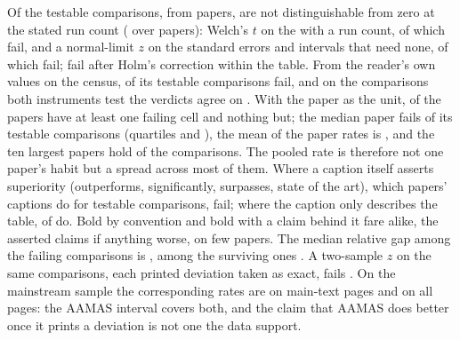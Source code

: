 \documentclass[sigconf,anonymous]{aamas}
\begin{document}
Of the \nANTestable{} testable comparisons, from \nAPapersTestable{} papers,
\nAPctFail{} are not distinguishable from zero at the stated run count
(\nAPctFailCi{} over papers): Welch's $t$ on the \nWelchN{} with a run
count, \nWelchFail{} of which fail, and a normal-limit $z$ on the \nZN{}
standard errors and intervals that need none, \nZFail{} of which fail;
\nAPctFailHolm{} fail after Holm's correction within the table. From the
reader's own values on the census, \nCzReaderFail{} of its
\nCzReaderFailN{} testable comparisons fail, and on the \nCzShared{}
comparisons both instruments test the verdicts agree on \nCzSharedAgree{}.
With the paper as the unit, \nPpAnyFail{} of the \nPpPapers{} papers have at least
one failing cell and \nPpAllFail{} nothing but; the median paper fails
\nPpMedian{} of its testable comparisons (quartiles \nPpQOne{} and
\nPpQThree{}), the mean of the paper rates is \nPpMean{}, and the ten
largest papers hold \nPpTopTenShare{} of the comparisons. The pooled rate
is therefore not one paper's habit but a spread across most of them. Where
a caption itself asserts superiority (outperforms, significantly, surpasses,
state of the art), which \nCapAssertingPapers{} papers' captions do for
\nCapAssertingN{} testable comparisons, \nCapAssertingFail{} fail; where
the caption only describes the table, \nCapDescribingFail{} of
\nCapDescribingN{} do. Bold by convention and bold with a claim behind it
fare alike, the asserted claims if anything worse, on few papers. The median relative gap among the failing
comparisons is \nAGapFail{}, among the surviving ones \nAGapPass{}. A
two-sample $z$ on the same comparisons, each printed deviation taken as
exact, fails \nSpanZTwoSidedFail{}. On the mainstream sample the
corresponding rates are \nMlMainFail{} on main-text pages and \nMlPctFail{}
on all pages: the AAMAS interval covers both, and the claim that AAMAS does
better once it prints a deviation is not one the data support.
\end{document}
